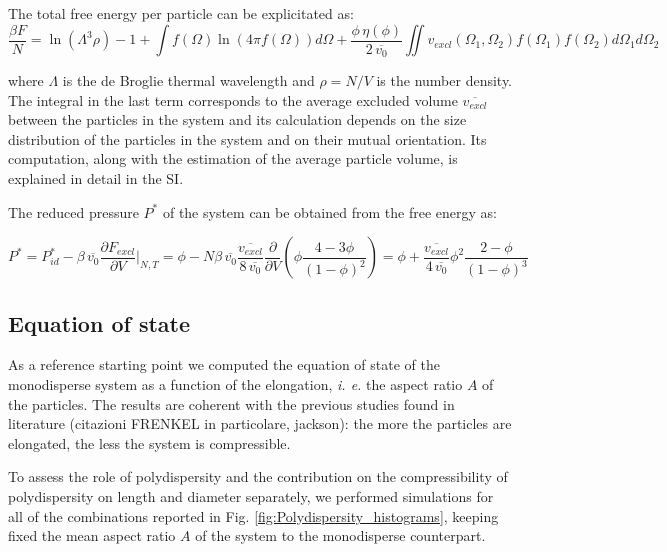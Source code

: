 \documentclass[journal=jacsat,manuscript=article]{achemso}
\begin{document}
The total free energy per particle can be explicitated as:
\begin{equation}
    \frac{\beta F}{N} = \ln(\Lambda^3 \rho) - 1 + \int f(\Omega) \ln(4 \pi f(\Omega)) d \Omega + \frac{\phi \, \eta(\phi)}{2 \, \overline{v_{0}}} \iint v_{excl} (\Omega_1, \Omega_2) f(\Omega_1)f(\Omega_2) d\Omega_1 d\Omega_2
\end{equation}

where $\Lambda$ is the de Broglie thermal wavelength and $\rho = N/V$ is the number density. The integral in the last term corresponds to the average excluded volume $\overline{v_{excl}}$ between the particles in the system and its calculation depends on the size distribution of the particles in the system and on their mutual orientation. Its computation, along with the estimation of the average particle volume, is explained in detail in the SI.

The reduced pressure $P^*$ of the system can be obtained from the free energy as:

\begin{equation}
    P^* =  P^*_{id} - \beta \, \overline{v_0} \frac{\partial F_{excl}}{\partial V} \rvert _{N, T}  = \phi - N \beta \, \overline{v_0} \frac{\overline{v_{excl}}}{8 \, \overline{v_0}} \frac{\partial}{\partial V} \left( \phi \frac{4 - 3 \phi}{(1 - \phi)^2} \right) \nonumber = \phi + \frac{\overline{v_{excl}}}{4 \, \overline{v_0}} \phi^2 \frac{2 - \phi}{(1 - \phi)^3} \label{ParsonLee}
\end{equation}


\subsection{Equation of state}

As a reference starting point we computed the equation of state of the monodisperse system as a function of the elongation, \textit{i. e.} the aspect ratio $A$ of the particles. The results are coherent with the previous studies found in literature (citazioni FRENKEL in particolare, jackson): the more the particles are elongated, the less the system is compressible.


To assess the role of polydispersity and the contribution on the compressibility of polydispersity on length and diameter separately, we performed simulations for  all of the combinations reported in Fig. \ref{fig:Polydispersity_histograms}, keeping fixed the mean aspect ratio $A$ of the system to the monodisperse counterpart.
\end{document}
